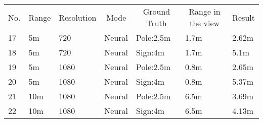 \begin{table}[]
  \begin{tabular}{lllllll}
  \rowcolor[HTML]{4472C4} 
  No. & \multicolumn{1}{c}{\cellcolor[HTML]{4472C4}Range} & \multicolumn{1}{c}{\cellcolor[HTML]{4472C4}Resolution} & \multicolumn{1}{c}{\cellcolor[HTML]{4472C4}Mode} & \multicolumn{1}{c}{\cellcolor[HTML]{4472C4}Ground Truth} & \multicolumn{1}{c}{\cellcolor[HTML]{4472C4}Range in the view} & \multicolumn{1}{c}{\cellcolor[HTML]{4472C4}Result} \\
  17  & 5m                                                & 720                                                    & Neural                                           & Pole:2.5m                                                & 1.7m                                                          & 2.62m                                              \\
  18  & 5m                                                & 720                                                    & Neural                                           & Sign:4m                                                  & 1.7m                                                          & 5.1m                                               \\
  19  & 5m                                                & 1080                                                   & Neural                                           & Pole:2.5m                                                & 0.8m                                                          & 2.65m                                              \\
  20  & 5m                                                & 1080                                                   & Neural                                           & Sign:4m                                                  & 0.8m                                                          & 5.37m                                              \\
  21  & 10m                                               & 1080                                                   & Neural                                           & Pole:2.5m                                                & 6.5m                                                          & 3.69m                                              \\
  22  & 10m                                               & 1080                                                   & Neural                                           & Sign:4m                                                  & 6.5m                                                          & 4.13m                                              \\

\end{tabular}
\end{table}
